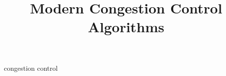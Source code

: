 \documentclass[conference]{IEEEtran}
\begin{document}
\title{Modern Congestion Control Algorithms}

\author{
}

\maketitle



\begin{abstract}

\end{abstract}

\begin{IEEEkeywords}
congestion control
\end{IEEEkeywords}



















\end{document}
